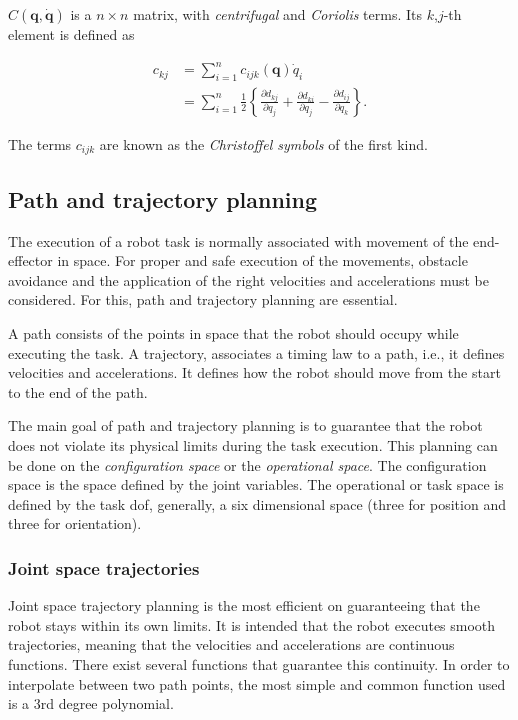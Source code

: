 $C(\boldsymbol{q}, \dot{\boldsymbol{q}})$ is a $n \times n$ matrix, with \emph{centrifugal} and \emph{Coriolis} terms. Its $k$,$j$-th element is defined as

\begin{align}
    c_{kj} &= \sum^n_{i=1} c_{ijk}(\boldsymbol{q})\dot{q}_i \\
    &= \sum^n_{i=1} \frac{1}{2} \left\{ \frac{\partial d_{kj}}{\partial q_j} + \frac{\partial d_{ki}}{\partial q_j} - \frac{\partial d_{ij}}{\partial q_k} \right\}.
\end{align}

The terms $c_{ijk}$ are known as the \emph{Christoffel symbols} of the first kind.


\subsection{Path and trajectory planning}
\label{subsec:path_trajectory_planning}

The execution of a robot task is normally associated with movement of the end-effector in space. For proper and safe execution of the movements, obstacle avoidance and the application of the right velocities and accelerations must be considered. For this, path and trajectory planning are essential.

A path consists of the points in space that the robot should occupy while executing the task. A trajectory, associates a timing law to a path, i.e., it defines velocities and accelerations. It defines how the robot should move from the start to the end of the path.

The main goal of path and trajectory planning is to guarantee that the robot does not violate its physical limits during the task execution. This planning can be done on the \emph{configuration space} or the \emph{operational space}. The configuration space is the space defined by the joint variables. The operational or task space is defined by the task \gls{dof}, generally, a six dimensional space (three for position and three for orientation).

\subsubsection{Joint space trajectories}
\label{subsubsec:joint_space_trajectories}

Joint space trajectory planning is the most efficient on guaranteeing that the robot stays within its own limits. It is intended that the robot executes smooth trajectories, meaning that the velocities and accelerations are continuous functions. There exist several functions that guarantee this continuity. In order to interpolate between two path points, the most simple and common function used is a 3rd degree polynomial.

